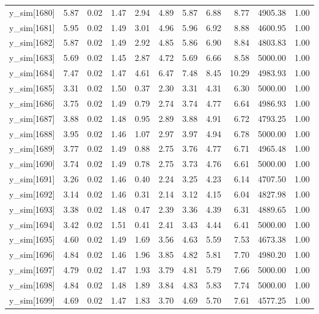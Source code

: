 \begin{table}[ht]
\begin{tabular}{rrrrrrrrrrr}
  y\_sim[1680] & 5.87 & 0.02 & 1.47 & 2.94 & 4.89 & 5.87 & 6.88 & 8.77 & 4905.38 & 1.00 \\ 
  y\_sim[1681] & 5.95 & 0.02 & 1.49 & 3.01 & 4.96 & 5.96 & 6.92 & 8.88 & 4600.95 & 1.00 \\ 
  y\_sim[1682] & 5.87 & 0.02 & 1.49 & 2.92 & 4.85 & 5.86 & 6.90 & 8.84 & 4803.83 & 1.00 \\ 
  y\_sim[1683] & 5.69 & 0.02 & 1.45 & 2.87 & 4.72 & 5.69 & 6.66 & 8.58 & 5000.00 & 1.00 \\ 
  y\_sim[1684] & 7.47 & 0.02 & 1.47 & 4.61 & 6.47 & 7.48 & 8.45 & 10.29 & 4983.93 & 1.00 \\ 
  y\_sim[1685] & 3.31 & 0.02 & 1.50 & 0.37 & 2.30 & 3.31 & 4.31 & 6.30 & 5000.00 & 1.00 \\ 
  y\_sim[1686] & 3.75 & 0.02 & 1.49 & 0.79 & 2.74 & 3.74 & 4.77 & 6.64 & 4986.93 & 1.00 \\ 
  y\_sim[1687] & 3.88 & 0.02 & 1.48 & 0.95 & 2.89 & 3.88 & 4.91 & 6.72 & 4793.25 & 1.00 \\ 
  y\_sim[1688] & 3.95 & 0.02 & 1.46 & 1.07 & 2.97 & 3.97 & 4.94 & 6.78 & 5000.00 & 1.00 \\ 
  y\_sim[1689] & 3.77 & 0.02 & 1.49 & 0.88 & 2.75 & 3.76 & 4.77 & 6.71 & 4965.48 & 1.00 \\ 
  y\_sim[1690] & 3.74 & 0.02 & 1.49 & 0.78 & 2.75 & 3.73 & 4.76 & 6.61 & 5000.00 & 1.00 \\ 
  y\_sim[1691] & 3.26 & 0.02 & 1.46 & 0.40 & 2.24 & 3.25 & 4.23 & 6.14 & 4707.50 & 1.00 \\ 
  y\_sim[1692] & 3.14 & 0.02 & 1.46 & 0.31 & 2.14 & 3.12 & 4.15 & 6.04 & 4827.98 & 1.00 \\ 
  y\_sim[1693] & 3.38 & 0.02 & 1.48 & 0.47 & 2.39 & 3.36 & 4.39 & 6.31 & 4889.65 & 1.00 \\ 
  y\_sim[1694] & 3.42 & 0.02 & 1.51 & 0.41 & 2.41 & 3.43 & 4.44 & 6.41 & 5000.00 & 1.00 \\ 
  y\_sim[1695] & 4.60 & 0.02 & 1.49 & 1.69 & 3.56 & 4.63 & 5.59 & 7.53 & 4673.38 & 1.00 \\ 
  y\_sim[1696] & 4.84 & 0.02 & 1.46 & 1.96 & 3.85 & 4.82 & 5.81 & 7.70 & 4980.20 & 1.00 \\ 
  y\_sim[1697] & 4.79 & 0.02 & 1.47 & 1.93 & 3.79 & 4.81 & 5.79 & 7.66 & 5000.00 & 1.00 \\ 
  y\_sim[1698] & 4.84 & 0.02 & 1.48 & 1.89 & 3.84 & 4.83 & 5.83 & 7.74 & 5000.00 & 1.00 \\ 
  y\_sim[1699] & 4.69 & 0.02 & 1.47 & 1.83 & 3.70 & 4.69 & 5.70 & 7.61 & 4577.25 & 1.00 \\ 

\end{tabular}
\end{table}
